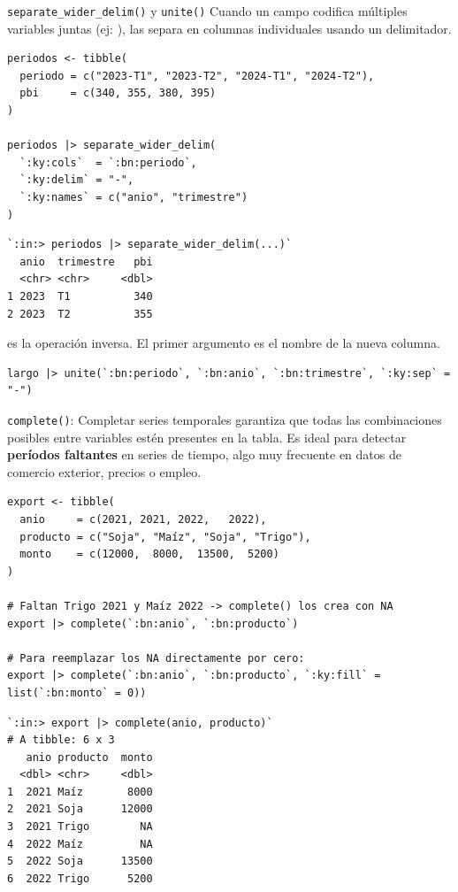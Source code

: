 \documentclass[8pt]{beamer}
\begin{document}
	\begin{frame}[fragile]{\texttt{separate\_wider\_delim()} y \texttt{unite()}}
		Cuando un campo codifica múltiples variables juntas (ej: ),  las separa en columnas individuales usando un delimitador.

\begin{lstlisting}[style=RScript]
periodos <- tibble(
  periodo = c("2023-T1", "2023-T2", "2024-T1", "2024-T2"),
  pbi     = c(340, 355, 380, 395)
)

periodos |> separate_wider_delim(
  `:ky:cols`  = `:bn:periodo`,
  `:ky:delim` = "-",
  `:ky:names` = c("anio", "trimestre")
)
\end{lstlisting}
\begin{lstlisting}[style=RConsole]
`:in:> periodos |> separate_wider_delim(...)`
  anio  trimestre   pbi
  <chr> <chr>     <dbl>
1 2023  T1          340
2 2023  T2          355
\end{lstlisting}

		 es la operación inversa. El primer argumento es el nombre de la nueva columna.
\begin{lstlisting}[style=RScript]
largo |> unite(`:bn:periodo`, `:bn:anio`, `:bn:trimestre`, `:ky:sep` = "-")
\end{lstlisting}
	\end{frame}


	\begin{frame}[fragile]{\texttt{complete()}: Completar series temporales}
		 garantiza que todas las combinaciones posibles entre variables estén presentes en la tabla. Es ideal para detectar \textbf{períodos faltantes} en series de tiempo, algo muy frecuente en datos de comercio exterior, precios o empleo.

\begin{lstlisting}[style=RScript]
export <- tibble(
  anio     = c(2021, 2021, 2022,   2022),
  producto = c("Soja", "Maíz", "Soja", "Trigo"),
  monto    = c(12000,  8000,  13500,  5200)
)

# Faltan Trigo 2021 y Maíz 2022 -> complete() los crea con NA
export |> complete(`:bn:anio`, `:bn:producto`)

# Para reemplazar los NA directamente por cero:
export |> complete(`:bn:anio`, `:bn:producto`, `:ky:fill` = list(`:bn:monto` = 0))
\end{lstlisting}
\begin{lstlisting}[style=RConsole]
`:in:> export |> complete(anio, producto)`
# A tibble: 6 x 3
   anio producto  monto
  <dbl> <chr>     <dbl>
1  2021 Maíz       8000
2  2021 Soja      12000
3  2021 Trigo        NA
4  2022 Maíz         NA
5  2022 Soja      13500
6  2022 Trigo      5200
\end{lstlisting}
	\end{frame}
\end{document}
